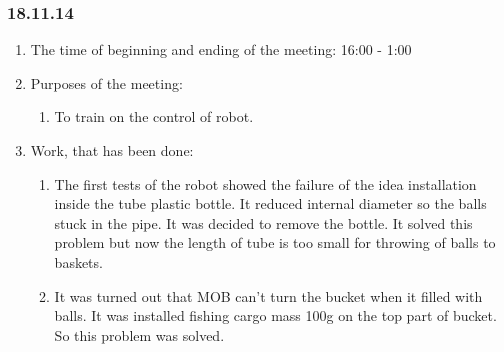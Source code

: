 \subsubsection{18.11.14}

\begin{enumerate}
	\item The time of beginning and ending of the meeting:
	16:00 - 1:00
	\item Purposes of the meeting:
	\begin{enumerate}
	  \item To train on the control of robot.
	  
    \end{enumerate}
    
	\item Work, that has been done:
	\begin{enumerate}
	  \item The first tests of the robot showed the failure of the idea installation inside the tube plastic bottle. It reduced internal diameter so the balls stuck in the pipe. It was decided to remove the bottle. It solved this problem but now the length of tube is too small for throwing of balls to baskets.
      
      \item It was turned out that MOB can't turn the bucket when it filled with balls. It was installed fishing cargo mass 100g on the top part of bucket. So this problem was solved.
      

\end{enumerate}
\end{enumerate}
